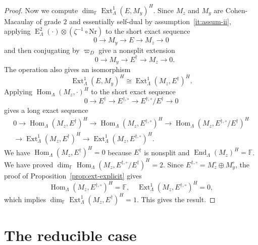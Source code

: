 \documentclass[11pt,a4paper]{article} %
\def\FF{\mathbb{F}}
\def\dim{\operatorname{dim}}
\def\E{\operatorname{E}}
\def\End{\operatorname{End}}
\def\Ext{\operatorname{Ext}} %
\def\Hom{\operatorname{Hom}}
\begin{document}
\begin{proof}
    Now we compute $\dim_\FF\Ext^1_{\Lambda}(E,M_y)^H$. Since $M_z$ and $M_y$ are Cohen-Macaulay of grade $2$ and essentially self-dual by assumption~\ref{it:assum-ii}, applying $\E_\Lambda^2(\cdot)\otimes(\zeta^{-1}\circ\mathrm{Nr})$ to the short exact sequence
    \[
    0\longrightarrow M_y\longrightarrow E\longrightarrow M_z\longrightarrow0
    \] 
    and then conjugating by $\varpi_D$ give a nonsplit extension
    \[
    \quad0\longrightarrow M_y\longrightarrow E^\dagger\longrightarrow M_z\longrightarrow0.
    \]
    The operation also gives an isomorphism
    \[
    \Ext^1_{\Lambda}(E,M_y)^H\cong\Ext^1_{\Lambda}(M_z,E^\dagger)^H.
    \]
    Applying $\Hom_{\Lambda}(M_z,\cdot)^H$ to the short exact sequence
    \[
    0\longrightarrow E^\dagger\longrightarrow E^{\dagger,\circ}\longrightarrow E^{\dagger,\circ}/E^\dagger\longrightarrow0
    \]
    gives a long exact sequence
    \[
    \begin{split}
         0\longrightarrow\Hom_{\Lambda}(M_z,E^\dagger)^H\longrightarrow\Hom_{\Lambda}(M_z,E^{\dagger,\circ})^H\longrightarrow\Hom_{\Lambda}(M_z,E^{\dagger,\circ}/E^\dagger)^H\\
         \longrightarrow\Ext^1_{\Lambda}(M_z,E^\dagger)^H\longrightarrow\Ext^1_{\Lambda}(M_z,E^{\dagger,\circ})^H.
    \end{split}
    \]
    We have $\Hom_{\Lambda}(M_z,E^\dagger)^H=0$ because $E^\dagger$ is nonsplit and $\End_\Lambda(M_z)^H=\FF$. We have proved $\dim_\FF\Hom_{\Lambda}(M_z,E^{\dagger,\circ}/E^\dagger)^H=2$. Since $E^{\dagger,\circ}=M_z^\circ\oplus M_y^\circ$, the proof of Proposition~\ref{prop:ext-explicit} gives 
    \[
    \Hom_{\Lambda}(M_z,E^{\dagger,\circ})^H=\FF,\quad\Ext^1_{\Lambda}(M_z,E^{\dagger,\circ})^H=0,
    \]
    which implies $\dim_\FF\Ext^1_{\Lambda}(M_z,E^\dagger)^H=1$. This gives the result.
\end{proof}


\section{The reducible case}
\end{document}
